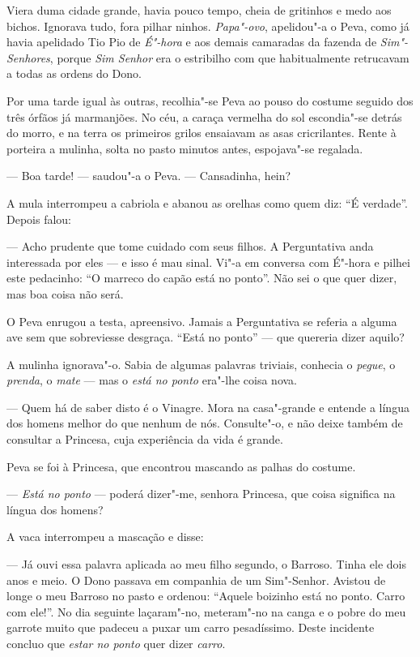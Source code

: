 Viera duma cidade grande, havia pouco tempo, cheia de gritinhos e medo
aos bichos. Ignorava tudo, fora pilhar ninhos. \emph{Papa"-ovo},
apelidou"-a o Peva, como já havia apelidado Tio Pio de \emph{É"-hora} e
aos demais camaradas da fazenda de \emph{Sim"-Senhores}, porque \emph{Sim
Senhor} era o estribilho com que habitualmente retrucavam a todas as
ordens do Dono.

Por uma tarde igual às outras, recolhia"-se Peva ao pouso do costume
seguido dos três órfãos já marmanjões. No céu, a caraça vermelha do sol
escondia"-se detrás do morro, e na terra os primeiros grilos ensaiavam as
asas cricrilantes. Rente à porteira a mulinha, solta no pasto minutos
antes, espojava"-se regalada.

--- Boa tarde! --- saudou"-a o Peva. --- Cansadinha, hein?

A mula interrompeu a cabriola e abanou as orelhas como quem diz: ``É
verdade''. Depois falou:

--- Acho prudente que tome cuidado com seus filhos. A Perguntativa anda
interessada por eles --- e isso é mau sinal. Vi"-a em conversa com É"-hora
e pilhei este pedacinho: ``O marreco do capão está no ponto''. Não sei o
que quer dizer, mas boa coisa não será.

O Peva enrugou a testa, apreensivo. Jamais a Perguntativa se referia a
alguma ave sem que sobreviesse desgraça. ``Está no ponto'' --- que
quereria dizer aquilo?

A mulinha ignorava"-o. Sabia de algumas palavras triviais, conhecia o
\emph{pegue}, o \emph{prenda}, o \emph{mate} --- mas o \emph{está no
ponto} era"-lhe coisa nova.

--- Quem há de saber disto é o Vinagre. Mora na casa"-grande e entende a
língua dos homens melhor do que nenhum de nós. Consulte"-o, e não deixe
também de consultar a Princesa, cuja experiência da vida é grande.

Peva se foi à Princesa, que encontrou mascando as palhas do costume.

--- \emph{Está no ponto} --- poderá dizer"-me, senhora Princesa, que
coisa significa na língua dos homens?

A vaca interrompeu a mascação e disse:

--- Já ouvi essa palavra aplicada ao meu filho segundo, o Barroso. Tinha
ele dois anos e meio. O Dono passava em companhia de um Sim"-Senhor.
Avistou de longe o meu Barroso no pasto e ordenou: ``Aquele boizinho
está no ponto. Carro com ele!''. No dia seguinte laçaram"-no, meteram"-no
na canga e o pobre do meu garrote muito que padeceu a puxar um carro
pesadíssimo. Deste incidente concluo que \emph{estar no ponto} quer
dizer \emph{carro}.

